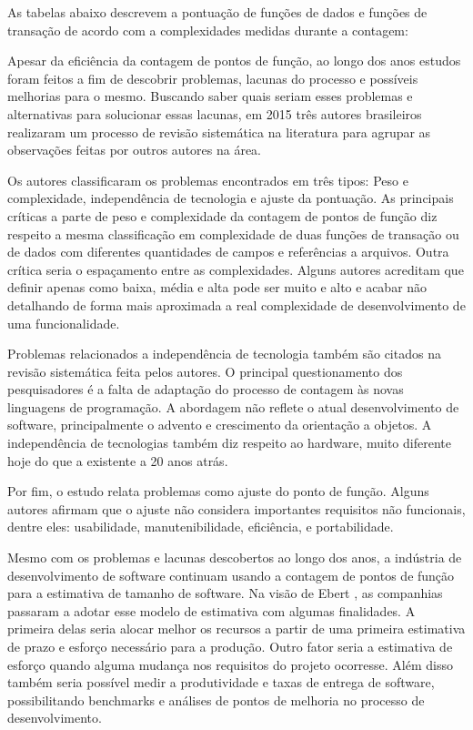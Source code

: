As tabelas abaixo descrevem a pontuação de funções de dados e funções de transação de acordo com a complexidades medidas durante a contagem:





Apesar da eficiência da contagem de pontos de função, ao longo dos anos estudos foram feitos a fim de descobrir problemas, lacunas do processo e possíveis melhorias para o mesmo. Buscando saber quais seriam esses problemas e alternativas para solucionar essas lacunas, em 2015 três autores brasileiros realizaram um processo de revisão sistemática na literatura para agrupar as observações feitas por outros autores na área.

Os autores classificaram os problemas encontrados em três tipos: Peso e complexidade, independência de tecnologia e ajuste da pontuação. As principais críticas a parte de peso e complexidade da contagem de pontos de função diz respeito a mesma classificação em complexidade de duas funções de transação ou de dados com diferentes quantidades de campos e referências a arquivos. Outra crítica seria o espaçamento entre as complexidades. Alguns autores acreditam que definir apenas como baixa, média e alta pode ser muito e alto e acabar não detalhando de forma mais aproximada a real complexidade de desenvolvimento de uma funcionalidade. \cite{Marcos:2015}

Problemas relacionados a independência de tecnologia também são citados na revisão sistemática feita pelos autores. O principal questionamento dos pesquisadores é a falta de adaptação do processo de contagem às novas linguagens de programação. A abordagem não reflete o atual desenvolvimento de software, principalmente o advento e crescimento da orientação a objetos. A independência de tecnologias também diz respeito ao hardware, muito diferente hoje do que a existente a 20 anos atrás. \cite{Marcos:2015}

Por fim, o estudo relata problemas como ajuste do ponto de função. Alguns autores afirmam que o ajuste não considera  importantes requisitos não funcionais, dentre eles: usabilidade, manutenibilidade, eficiência, e portabilidade. \cite{Marcos:2015}

Mesmo com os problemas e lacunas descobertos ao longo dos anos, a indústria de desenvolvimento de software continuam usando a contagem de pontos de função para a estimativa de tamanho de software. Na visão de Ebert \cite{Ebert:2014}, as companhias passaram a adotar esse modelo de estimativa com algumas finalidades. A primeira delas seria alocar melhor os recursos a partir de uma primeira estimativa de prazo e esforço necessário para a produção. Outro fator seria a estimativa de esforço quando alguma mudança nos requisitos do projeto ocorresse. Além disso também seria possível medir a produtividade e taxas de entrega de software, possibilitando benchmarks  e análises de pontos de melhoria no processo de desenvolvimento.

